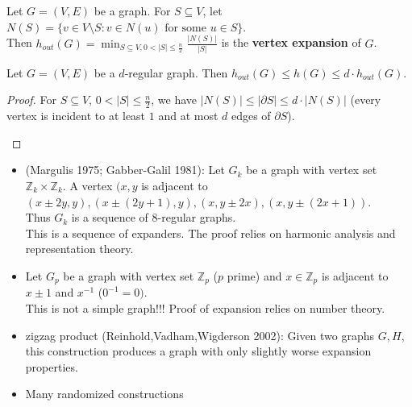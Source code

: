 \begin{definition}\label{9.5}
    Let $G=(V,E)$ be a graph. For $S\subseteq V$, let $N(S)=\{v\in V\setminus S:v\in N(u) \text{ for some } u\in S\}$.\\
    Then $h_{out}(G)=\min_{S\subseteq V, 0<|S|\leq \frac{n}{2}} \frac{|N(S)|}{|S|}$ is the \textbf{vertex expansion} of $G$. 
\end{definition}
\begin{lemma}\label{9.6}
    Let $G=(V,E)$ be a $d$-regular graph. Then $h_{out}(G)\leq h(G)\leq d\cdot h_{out}(G)$.
\end{lemma}
\begin{proof}
    For $S\subseteq V$, $0<|S|\leq \frac{n}{2}$, we have $|N(S)|\leq |\partial S|\leq d\cdot |N(S)|$ (every vertex is incident to at least $1$ and at most $d$ edges of $\partial S$).
\begin{center}            
    \end{center}
\end{proof}
\begin{example}\label{9.7}
    \begin{itemize}
        \item (Margulis 1975; Gabber-Galil 1981): Let $G_k$ be a graph with vertex set $\mathbb{Z}_k\times \mathbb{Z}_k$. A vertex $(x,y$ is adjacent to $(x\pm 2y,y),(x\pm (2y+1),y),(x,y\pm 2x),(x,y\pm (2x+1))$.\\
        Thus $G_k$ is a sequence of $8$-regular graphs.\\
        This is a sequence of expanders. The proof relies on harmonic analysis and representation theory.
        \item Let $G_p$ be a graph with vertex set $\mathbb{Z}_p$ ($p$ prime) and $x\in \mathbb{Z}_p$ is adjacent to $x\pm 1$ and $x^{-1}$ ($0^{-1}=0)$.\\
        This is not a simple graph!!! Proof of expansion relies on number theory.
        \item zigzag product (Reinhold,Vadham,Wigderson 2002): Given two graphs $G,H$, this construction produces a graph with only slightly worse expansion properties.
        \item Many randomized constructions  
    \end{itemize}
\end{example}

